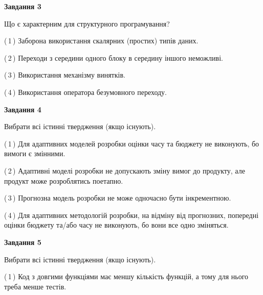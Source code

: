 \documentclass[10pt, ukrainian]{article}
\begin{document}
{\begin {large}
{\begin {center}\textbf{Завдання 3}\end {center}}\par
Що є характерним для структурного програмування?\par
\vspace{2mm}



(\,1\,) Заборона використання скалярних (простих) типів даних. %



(\,2\,) Переходи з середини одного блоку в середину іншого неможливі. %



(\,3\,) Використання механізму винятків. %



(\,4\,) Використання оператора безумовного переходу. %


{\begin {center}\textbf{Завдання 4}\end {center}}\par
Вибрати всі істинні твердження (якщо існують).\par
\vspace{2mm}



(\,1\,) Для адаптивних моделей розробки оцінки часу та бюджету не виконують, бо вимоги є змінними. %



(\,2\,) Адаптивні моделі розробки не допускають зміну вимог до продукту, але продукт може розроблятись поетапно. %



(\,3\,) Прогнозна модель розробки не може одночасно бути інкрементною. %



(\,4\,) Для адаптивних методологій розробки, на відміну від прогнозних, попередні оцінки бюджету та/або часу не виконують, бо вони все одно зміняться. %


{\begin {center}\textbf{Завдання 5}\end {center}}\par
Вибрати всі істинні твердження (якщо існують).\par
\vspace{2mm}



(\,1\,) Код з довгими функціями має меншу кількість функцій, а тому для нього треба менше тестів. %




\end{large}}
\end{document}
